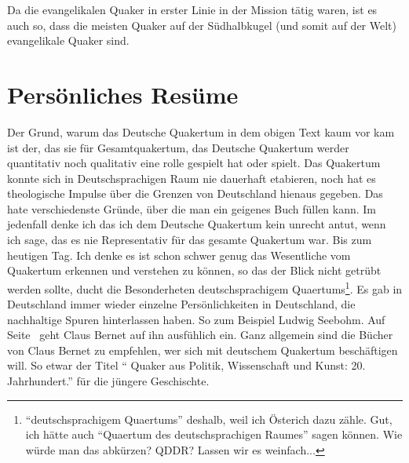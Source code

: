 Da die evangelikalen Quaker in erster Linie in der Mission tätig waren, ist es
auch so, dass die meisten Quaker auf der Südhalbkugel (und somit auf der Welt)
evangelikale Quaker sind.

\section{Persönliches Resüme}

Der Grund, warum das Deutsche Quakertum in dem obigen Text kaum vor kam ist der,
das sie für Gesamtquakertum, das Deutsche Quakertum werder quantitativ noch
qualitativ eine rolle gespielt hat oder spielt. Das Quakertum konnte sich in
Deutschsprachigen Raum nie dauerhaft etabieren, noch hat es theologische Impulse
über die Grenzen von Deutschland hienaus gegeben. Das hate verschiedenste
Gründe, über die man ein geigenes Buch füllen kann. Im jedenfall denke ich das
ich dem Deutsche Quakertum kein unrecht antut, wenn ich sage, das es nie
Representativ für das gesamte Quakertum war. Bis zum heutigen Tag. Ich denke es
ist schon schwer genug das Wesentliche vom Quakertum erkennen und verstehen zu
können, so das der Blick nicht getrübt werden sollte, ducht die Besonderheten
deutschsprachigem Quaertums\footnote{"`deutschsprachigem Quaertums"' deshalb,
weil ich Österich dazu zähle. Gut, ich hätte auch "`Quaertum des
deutschsprachigen Raumes"' sagen können. Wie würde man das abkürzen? QDDR?
Lassen wir es weinfach...}. Es gab in Deutschland immer wieder einzelne
Persönlichkeiten in Deutschland, die nachhaltige Spuren hinterlassen haben. So
zum Beispiel Ludwig Seebohm. Auf Seite~\pageref{ref:l_seebohm} geht Claus Bernet
auf ihn ausfühlich ein. Ganz allgemein sind die Bücher von Claus Bernet zu
empfehlen, wer sich mit deutschem Quakertum beschäftigen will. So etwar der
Titel "`
Quaker aus Politik, Wissenschaft und Kunst: 20. Jahrhundert."' für die jüngere
Geschischte.

\medskip

